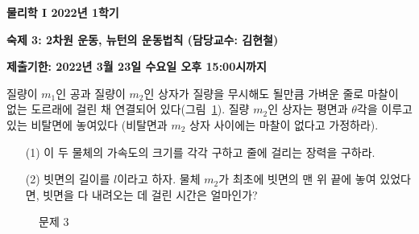 \documentclass[fleqn,10pt]{article}%
\begin{document}
\begin{center}
\textbf{\Large 물리학 I 2022년 1학기}
\vspace{0.5cm}

\textbf{숙제 3: 2차원 운동, 뉴턴의 운동법칙 (담당교수: 김현철)}
\end{center}
\vspace{0.8cm}

\textbf{\color{red}제출기한: 2022년 3월 23일 수요일 오후 15:00시까지}
\vspace{1.0cm}



 질량이 $m_1$인 공과 질량이 $m_2$인 상자가
질량을 무시해도 될만큼 가벼운 줄로 마찰이 없는 도르래에 걸린 채
연결되어 있다(그림~\ref{fig:3}). 질량 $m_2$인 상자는 평면과
$\theta$각을 이루고 있는 비탈면에 놓여있다 (비탈면과 $m_2$ 상자
사이에는 마찰이 없다고 가정하라).
\begin{itemize}
\item[(1)] 이 두 물체의 가속도의 크기를 각각 구하고 줄에 걸리는 장력을
  구하라.    
\item[(2)] 빗면의 길이를 $l$이라고 하자. 물체 $m_2$가 최초에 빗면의 맨
  위 끝에 놓여 있었다면, 빗면을 다 내려오는 데 걸린 시간은 얼마인가? 
\end{itemize}
 
\begin{figure}[h]
  \centering
  \caption{문제 3}
\label{fig:3}  
\end{figure}
\end{document}
